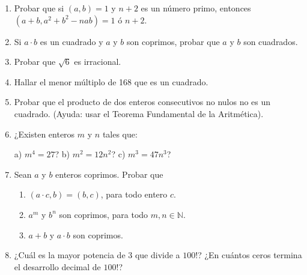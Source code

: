 \documentclass[12pt,spanish,makeidx]{amsbook}
\begin{document}
\begin{enumerate}
\smallskip

\item Probar que si $(a,b)=1$ y $n+2$ es un n\'umero primo, entonces $(a+b, a^2 + b^2 - nab) = 1$ \'o $n+2$.



\smallskip

\item Si $a\cdot b$ es un cuadrado y $a$ y $b$ son coprimos, probar que $a$ y $b$ son cuadrados.



\medskip

\item Probar que $\sqrt 6$ es irracional.







\medskip

\item Hallar el menor m\'ultiplo de 168 que es un cuadrado.



\medskip

\item Probar que el producto de dos enteros consecutivos no nulos no es un cuadrado. (Ayuda: usar el Teorema Fundamental de la Aritm\'etica).

\medskip



\item ¿Existen enteros $m$ y $n$ tales que:

a) $m^4=27$? \qquad \qquad b) $m^2 = 12n^2$? \qquad \qquad c) $m^3 = 47n^3$?




\smallskip
\item Sean $a$ y $b$ enteros coprimos. Probar que
\begin{enumerate}
  \item $(a\cdot c, b)=(b,c)$, para todo entero $c$.
  \item $a^m$ y $b^n$ son coprimos, para todo $m,n\in \mathbb N$.
  \item $a+b$ y $a\cdot b$ son coprimos.
\end{enumerate}



\smallskip


\item ¿Cu\'al es la mayor potencia de $3$ que divide a $100!$? ¿En cu\'antos ceros termina el de\-sa\-rro\-llo decimal de $100!$?


\end{enumerate}
\end{document}
